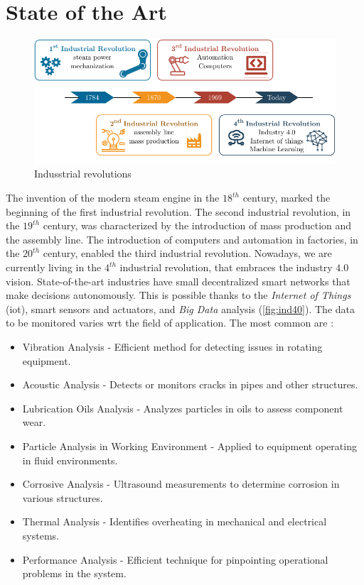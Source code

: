 \chapter{State of the Art}
\label{ch:state_of_the_art}

\begin{figure}[h]
    \centering
    \includegraphics[width=\textwidth]{images/StateArt/Industry40.pdf}
    \caption{Indusstrial revolutions}
    \label{fig:ind40}    
\end{figure}

The invention of the modern steam engine in the $18^{th}$ century, marked the beginning of the first industrial revolution. The second industrial revolution, in the $19^{th}$ century, was characterized by the introduction of mass production and the assembly line. The introduction of computers and automation in factories, in the $20^{th}$ century, enabled the third industrial revolution. Nowadays, we are currently living in the $4^{th}$ industrial revolution, that embraces the industry $4.0$ vision. State-of-the-art industries have small decentralized smart networks that make decisions autonomously. This is possible thanks to the \emph{Internet of Things} (\gls{iot}), smart sensors and actuators, and \emph{Big Data} analysis (\autoref{fig:ind40}). 
The data to be monitored varies \gls{wrt} the field of application. The most common are \cite{State_Art_Coanda_2020}:
\begin{itemize}
    \item Vibration Analysis - Efficient method for detecting issues in rotating equipment.
    \item Acoustic Analysis - Detects or monitors cracks in pipes and other structures.
    \item Lubrication Oils Analysis - Analyzes particles in oils to assess component wear.
    \item Particle Analysis in Working Environment - Applied to equipment operating in fluid environments.
    \item Corrosive Analysis - Ultrasound measurements to determine corrosion in various structures.
    \item Thermal Analysis - Identifies overheating in mechanical and electrical systems.
    \item Performance Analysis - Efficient technique for pinpointing operational problems in the system.
\end{itemize}



